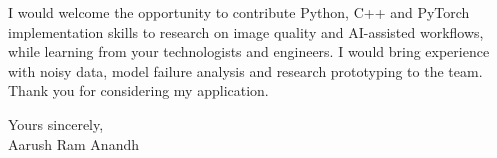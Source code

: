\documentclass[11pt,a4paper]{article}
\begin{document}
I would welcome the opportunity to contribute Python, C++ and PyTorch implementation skills to research on image quality and AI-assisted workflows, while learning from your technologists and engineers. I would bring experience with noisy data, model failure analysis and research prototyping to the team. Thank you for considering my application.\par\vspace{14pt}
Yours sincerely,\\[5pt]
Aarush Ram Anandh
\end{document}
